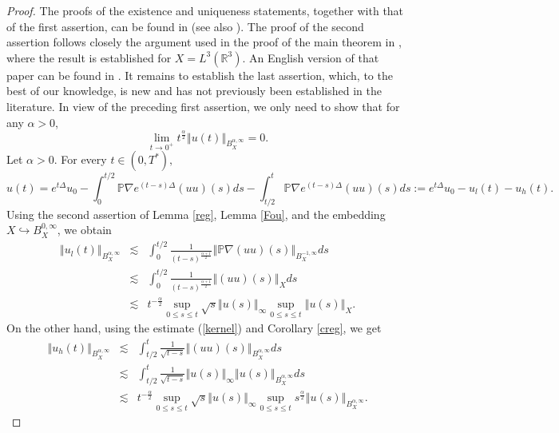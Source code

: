 \documentclass[11pt]{amsart}%
\theoremstyle{plain}
\numberwithin{equation}{section}
\begin{document}
\begin{proof}
   The proofs of the existence and uniqueness statements, together with that of the first assertion, can be found in \cite{May} (see also \cite{Lem2}). The proof of the second assertion follows closely the argument used in the proof of the main theorem in \cite{May2}, where the result is established for $X=L^3(\mathbb{R}^3)$. An English version of that paper can be found in \cite{May3}.  It remains to establish the last assertion, which, to the best of our knowledge, is new and has not previously been established in the literature. In view of the preceding first assertion, we only need to show that for any $\alpha>0$,
    \begin{equation}\label{creg}
        \lim_{t\to 0^+}t^{\frac{\alpha}{2}}\left\Vert u(t)\right\Vert_{B^{\alpha,\infty}_X}=0.
    \end{equation}
Let $\alpha>0$. For every $t\in (0,T^\ast),$
\[
u(t)=e^{t\Delta}u_0 -\int_{0}^{t/2}\mathbb{P}\nabla e^{(t-s)\Delta }(uu)(s)ds-\int_{t/2}^{t}\mathbb{P}\nabla e^{(t-s)\Delta }(uu)(s)ds:=
e^{t\Delta}u_0 -u_l (t)-u_h (t).
\]
Using the second assertion of Lemma \ref{reg}, Lemma \ref{Fou}, and the embedding  $X \hookrightarrow B^{0,\infty}_X$,  we obtain
\begin{eqnarray*}
    \left\Vert u_l(t)\right\Vert_{B^{\alpha,\infty}_X}&\lesssim &\int_0^{t/2} \frac{1}{(t-s)^{\frac{\alpha+1}{2}}} \left\Vert \mathbb{P}\nabla(uu)(s)\right\Vert_{B^{-1,\infty}_X}ds\\
    &\lesssim& \int_0^{t/2} \frac{1}{(t-s)^{\frac{\alpha+1}{2}}} \left\Vert (uu)(s)\right\Vert_Xds\\
    &\lesssim& t^{-\frac{\alpha}{2}} \sup_{0\leq s\leq t}\sqrt{s}\left\Vert u(s)\right\Vert_\infty \sup_{0\leq s\leq t}\left\Vert u(s)\right\Vert_X.
\end{eqnarray*}
On the other hand, using the estimate (\ref{kernel}) and Corollary \ref{creg}, we get
\begin{eqnarray*}
    \left\Vert u_h(t)\right\Vert_{B^{\alpha,\infty}_X}&\lesssim &\int_{t/2}^t \frac{1}{\sqrt{t-s}}\left\Vert (uu)(s)\right\Vert_{B^{\alpha,\infty}_X}ds\\
    &\lesssim& \int_{t/2} ^t \frac{1}{\sqrt{t-s}} \left\Vert u(s)\right\Vert_\infty \left\Vert u(s)\right\Vert_{B^{\alpha,\infty}_X}ds\\
    &\lesssim &t^{-\frac{\alpha}{2}} \sup_{0\leq s\leq t}\sqrt{s}\left\Vert u(s)\right\Vert_\infty \sup_{0\leq s\leq t}s^\frac{\alpha}{2}\left\Vert u(s)\right\Vert_{B^{\alpha,\infty}_X}.
\end{eqnarray*}

\end{proof}
\end{document}
